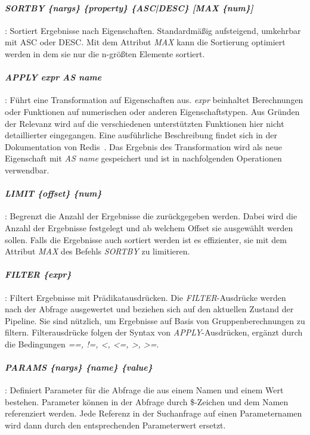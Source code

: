 \paragraph{\emph{SORTBY \{nargs\} \{property\} \{ASC|DESC\} [MAX \{num\}]}}: Sortiert Ergebnisse nach Eigenschaften. Standardmäßig aufsteigend, umkehrbar mit ASC oder DESC. Mit dem Attribut \emph{MAX} kann die Sortierung optimiert werden in dem sie nur die n-größten Elemente sortiert.

\paragraph{\emph{APPLY {expr} AS {name}}}: Führt eine Transformation auf Eigenschaften aus. \emph{expr} beinhaltet Berechnungen oder Funktionen auf numerischen oder anderen Eigenschaftstypen. Aus Gründen der Relevanz wird auf die verschiedenen unterstützten Funktionen hier nicht detaillierter eingegangen. Eine ausführliche Beschreibung findet sich in der Dokumentation von Redis~\cite{redis_ltd_aggregations_nodate}. Das Ergebnis des Transformation wird als neue Eigenschaft mit \emph{AS {name}} gespeichert und ist in nachfolgenden Operationen verwendbar.

\paragraph{\emph{LIMIT \{offset\} \{num\}}}: Begrenzt die Anzahl der Ergebnisse die zurückgegeben werden. Dabei wird die Anzahl der Ergebnisse festgelegt und ab welchem Offset sie ausgewählt werden sollen. Falls die Ergebnisse auch sortiert werden ist es effizienter, sie mit dem Attribut \emph{MAX} des Befehls \emph{SORTBY} zu limitieren.

\paragraph{\emph{FILTER \{expr\}}}: Filtert Ergebnisse mit Prädikatausdrücken. Die \emph{FILTER}-Ausdrücke werden nach der Abfrage ausgewertet und beziehen sich auf den aktuellen Zustand der Pipeline. Sie sind nützlich, um Ergebnisse auf Basis von Gruppenberechnungen zu filtern. Filterausdrücke folgen der Syntax von \emph{APPLY}-Ausdrücken, ergänzt durch die Bedingungen \emph{==, !=, <, <=, >, >=}.

\paragraph{\emph{PARAMS \{nargs\} \{name\} \{value\}}}: Definiert Parameter für die Abfrage die aus einem Namen und einem Wert bestehen. Parameter können in der Abfrage durch \$-Zeichen und dem Namen referenziert werden. Jede Referenz in der Suchanfrage auf einen Parameternamen wird dann durch den entsprechenden Parameterwert ersetzt.

